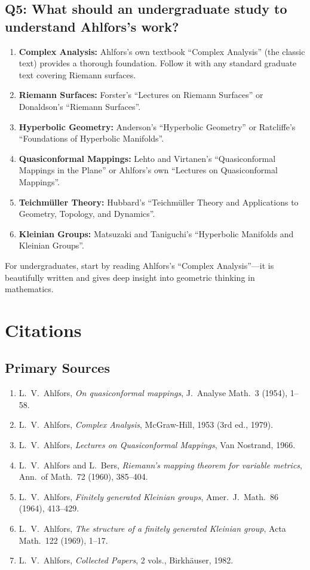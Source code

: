 \subsection*{Q5: What should an undergraduate study to understand Ahlfors's work?}

\begin{enumerate}
    \item \textbf{Complex Analysis:} Ahlfors's own textbook ``Complex Analysis'' (the classic text) provides a thorough foundation. Follow it with any standard graduate text covering Riemann surfaces.
    \item \textbf{Riemann Surfaces:} Forster's ``Lectures on Riemann Surfaces'' or Donaldson's ``Riemann Surfaces''.
    \item \textbf{Hyperbolic Geometry:} Anderson's ``Hyperbolic Geometry'' or Ratcliffe's ``Foundations of Hyperbolic Manifolds''.
    \item \textbf{Quasiconformal Mappings:} Lehto and Virtanen's ``Quasiconformal Mappings in the Plane'' or Ahlfors's own ``Lectures on Quasiconformal Mappings''.
    \item \textbf{Teichm{\"u}ller Theory:} Hubbard's ``Teichm{\"u}ller Theory and Applications to Geometry, Topology, and Dynamics''.
    \item \textbf{Kleinian Groups:} Matsuzaki and Taniguchi's ``Hyperbolic Manifolds and Kleinian Groups''.
\end{enumerate}

For undergraduates, start by reading Ahlfors's ``Complex Analysis''---it is beautifully written and gives deep insight into geometric thinking in mathematics.

\section{Citations}\subsection*{Primary Sources}
\begin{enumerate}
    \item L.\ V.\ Ahlfors, \textit{On quasiconformal mappings}, J.\ Analyse Math.\ 3 (1954), 1--58.
    \item L.\ V.\ Ahlfors, \textit{Complex Analysis}, McGraw-Hill, 1953 (3rd ed., 1979).
    \item L.\ V.\ Ahlfors, \textit{Lectures on Quasiconformal Mappings}, Van Nostrand, 1966.
    \item L.\ V.\ Ahlfors and L.\ Bers, \textit{Riemann's mapping theorem for variable metrics}, Ann.\ of Math.\ 72 (1960), 385--404.
    \item L.\ V.\ Ahlfors, \textit{Finitely generated Kleinian groups}, Amer.\ J.\ Math.\ 86 (1964), 413--429.
    \item L.\ V.\ Ahlfors, \textit{The structure of a finitely generated Kleinian group}, Acta Math.\ 122 (1969), 1--17.
    \item L.\ V.\ Ahlfors, \textit{Collected Papers}, 2 vols., Birkh\"{a}user, 1982.
\end{enumerate}

